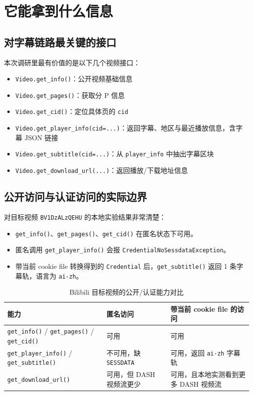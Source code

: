 \documentclass[a4paper]{article}
\begin{document}
\section{它能拿到什么信息}

\subsection{对字幕链路最关键的接口}

本次调研里最有价值的是以下几个视频接口：
\begin{itemize}
\item \texttt{Video.get\_info()}：公开视频基础信息
\item \texttt{Video.get\_pages()}：获取分 P 信息
\item \texttt{Video.get\_cid()}：定位具体页的 \texttt{cid}
\item \texttt{Video.get\_player\_info(cid=...)}：返回字幕、地区与最近播放信息，含字幕 JSON 链接
\item \texttt{Video.get\_subtitle(cid=...)}：从 \texttt{player\_info} 中抽出字幕区块
\item \texttt{Video.get\_download\_url(...)}：返回播放/下载地址信息
\end{itemize}

\subsection{公开访问与认证访问的实际边界}

对目标视频 \texttt{BV1DzALzQEHU} 的本地实验结果非常清楚：
\begin{itemize}
\item \texttt{get\_info()}、\texttt{get\_pages()}、\texttt{get\_cid()} 在匿名状态下可用。
\item 匿名调用 \texttt{get\_player\_info()} 会报 \texttt{CredentialNoSessdataException}。
\item 带当前 cookie file 转换得到的 \texttt{Credential} 后，\texttt{get\_subtitle()} 返回 1 条字幕轨，语言为 \texttt{ai-zh}。
\end{itemize}

\begin{table}[H]
\centering
\begin{tabularx}{\textwidth}{p{4.0cm}p{4.0cm}Y}
\toprule
能力 & 匿名访问 & 带当前 cookie file 的访问 \\
\midrule
\texttt{get\_info()} / \texttt{get\_pages()} / \texttt{get\_cid()} & 可用 & 可用 \\
\texttt{get\_player\_info()} / \texttt{get\_subtitle()} & 不可用，缺 \texttt{SESSDATA} & 可用，返回 \texttt{ai-zh} 字幕轨 \\
\texttt{get\_download\_url()} & 可用，但 DASH 视频流更少 & 可用，且本地实测看到更多 DASH 视频流 \\
\bottomrule
\end{tabularx}
\caption{Bilibili 目标视频的公开/认证能力对比}
\end{table}
\end{document}
